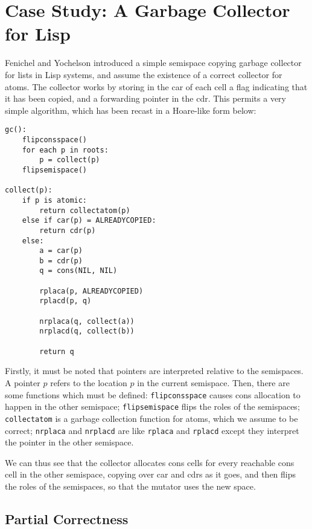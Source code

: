 \section{Case Study: A Garbage Collector for Lisp}
\label{sec:copying-example}

Fenichel and Yochelson\cite{Fenichel69} introduced a simple semispace
copying garbage collector for lists in Lisp systems, and assume the
existence of a correct collector for atoms. The collector works by
storing in the car of each cell a flag indicating that it has been
copied, and a forwarding pointer in the cdr. This permits a very
simple algorithm, which has been recast in a Hoare-like form below:

\begin{lstlisting}
gc():
    flipconsspace()
    for each p in roots:
        p = collect(p)
    flipsemispace()

collect(p):
    if p is atomic:
        return collectatom(p)
    else if car(p) = ALREADYCOPIED:
        return cdr(p)
    else:
        a = car(p)
        b = cdr(p)
        q = cons(NIL, NIL)

        rplaca(p, ALREADYCOPIED)
        rplacd(p, q)

        nrplaca(q, collect(a))
        nrplacd(q, collect(b))

        return q
\end{lstlisting}

Firstly, it must be noted that pointers are interpreted relative to
the semispaces. A pointer $p$ refers to the location $p$ in the
current semispace. Then, there are some functions which must be
defined: \texttt{flipconsspace} causes cons allocation to happen in
the other semispace; \texttt{flipsemispace} flips the roles of the
semispaces; \texttt{collectatom} is a garbage collection function for
atoms, which we assume to be correct; \texttt{nrplaca} and
\texttt{nrplacd} are like \texttt{rplaca} and \texttt{rplacd} except
they interpret the pointer in the other semispace.

We can thus see that the collector allocates cons cells for every
reachable cons cell in the other semispace, copying over car and cdrs
as it goes, and then flips the roles of the semispaces, so that the
mutator uses the new space.

\subsection{Partial Correctness}
\label{sec:copying-example-partial}

